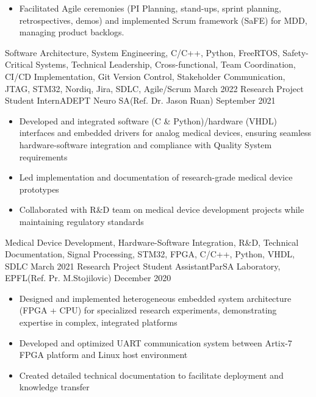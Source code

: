 \begin{experiences}
{\begin{itemize}
                        \item Facilitated Agile ceremonies (PI Planning, stand-ups, sprint planning, retrospectives, demos) and implemented Scrum framework (SaFE) for MDD, managing product backlogs. 
                      \end{itemize}
                    }
                {Software Architecture, System Engineering, C/C++, Python, FreeRTOS, Safety-Critical Systems, Technical Leadership, Cross-functional, Team Coordination, CI/CD Implementation, Git Version Control, Stakeholder Communication, JTAG, STM32, Nordiq, Jira, SDLC, Agile/Scrum}
  \emptySeparator
  \experience
    {March 2022}   {Research Project Student Intern}{ADEPT Neuro SA}{(Ref. Dr. Jason Ruan)}
    {September 2021} {
                      \begin{itemize}
                        \item Developed and integrated software (C \& Python)/hardware (VHDL) interfaces and embedded drivers for analog medical devices, ensuring seamless hardware-software integration and compliance with Quality System requirements
                        \item Led implementation and documentation of research-grade medical device prototypes
                        \item Collaborated with R\&D team on medical device development projects while maintaining regulatory standards
                      \end{itemize}
                    }
                    {Medical Device Development, Hardware-Software Integration, R\&D, Technical Documentation, Signal Processing, STM32, FPGA, C/C++, Python, VHDL, SDLC}
  \emptySeparator
  \experience
    {March 2021}   {Research Project Student Assistant}{ParSA Laboratory, EPFL}{(Ref. Pr. M.Stojilovic)}
    {December 2020} {
                      \begin{itemize}
                        \item Designed and implemented heterogeneous embedded system architecture (FPGA + CPU) for specialized research experiments, demonstrating expertise in complex, integrated platforms
                        \item Developed and optimized UART communication system between Artix-7 FPGA platform and Linux host environment
                        \item Created detailed technical documentation to facilitate deployment and knowledge transfer
                      \end{itemize}
}
\end{experiences}
